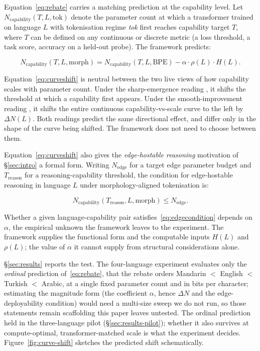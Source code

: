 Equation~\ref{eq:rebate} carries a matching prediction at the capability level. Let $N_{\mathrm{capability}}(T, L, \mathrm{tok})$ denote the parameter count at which a transformer trained on language $L$ with tokenisation regime \textit{tok} first reaches capability target $T$, where $T$ can be defined on any continuous or discrete metric (a loss threshold, a task score, accuracy on a held-out probe). The framework predicts:

\begin{equation}
N_{\mathrm{capability}}(T, L, \mathrm{morph}) = N_{\mathrm{capability}}(T, L, \mathrm{BPE}) - \alpha \cdot \rho(L) \cdot H(L).
\label{eq:curveshift}
\end{equation}

Equation~\ref{eq:curveshift} is neutral between the two live views of how capability scales with parameter count. Under the sharp-emergence reading \citep{wei2022}, it shifts the threshold at which a capability first appears. Under the smooth-improvement reading \citep{schaeffer2023}, it shifts the entire continuous capability-vs-scale curve to the left by $\Delta N(L)$. Both readings predict the same directional effect, and differ only in the shape of the curve being shifted. The framework does not need to choose between them.

Equation~\ref{eq:curveshift} also gives the \emph{edge-hostable reasoning} motivation of \S\ref{sec:intro} a formal form. Writing $N_{\mathrm{edge}}$ for a target edge parameter budget and $T_{\mathrm{reason}}$ for a reasoning-capability threshold, the condition for edge-hostable reasoning in language $L$ under morphology-aligned tokenisation is:

\begin{equation}
N_{\mathrm{capability}}(T_{\mathrm{reason}}, L, \mathrm{morph}) \le N_{\mathrm{edge}}.
\label{eq:edgecondition}
\end{equation}

Whether a given language-capability pair satisfies~\ref{eq:edgecondition} depends on $\alpha$, the empirical unknown the framework leaves to the experiment. The framework supplies the functional form and the computable inputs $H(L)$ and $\rho(L)$; the value of $\alpha$ it cannot supply from structural considerations alone.

\S\ref{sec:results} reports the test. The four-language experiment evaluates only the \emph{ordinal} prediction of~\ref{eq:rebate}, that the rebate orders Mandarin $<$ English $<$ Turkish $<$ Arabic, at a single fixed parameter count and in bits per character; estimating the magnitude form (the coefficient $\alpha$, hence $\Delta N$ and the edge-deployability condition) would need a multi-size sweep we do not run, so those statements remain scaffolding this paper leaves untested. The ordinal prediction held in the three-language pilot (\S\ref{sec:results-pilot}); whether it also survives at compute-optimal, transformer-matched scale is what the experiment decides. Figure~\ref{fig:curve-shift} sketches the predicted shift schematically.

